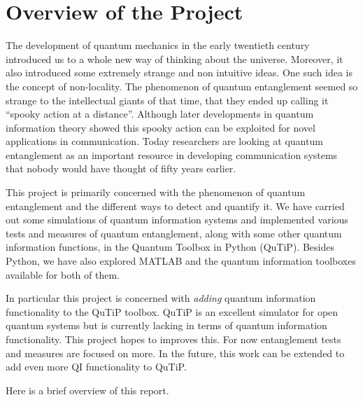 \chapter{Overview of the Project}

\par The development of quantum mechanics in the early twentieth century introduced us to a whole new way of thinking about the universe. Moreover, it also introduced some extremely strange and non intuitive ideas. One such idea is the concept of non-locality. The phenomenon of quantum entanglement seemed so strange to the intellectual giants of that time, that they ended up calling it “spooky action at a distance”. Although later developments in quantum information theory showed this spooky action can be exploited for novel applications in communication. Today researchers are looking at quantum entanglement as an important resource in developing communication systems that nobody would have thought of fifty years earlier.
\par This project is primarily concerned with the phenomenon of quantum entanglement and the different ways to detect and quantify it. We have carried out some simulations of quantum information systems and implemented various tests and measures of quantum entanglement, along with some other quantum information functions, in the Quantum Toolbox in Python (QuTiP). Besides Python, we have also explored MATLAB and the quantum information toolboxes available for both of them.
\par In particular this project is concerned with \textit{adding} quantum information functionality to the QuTiP toolbox. QuTiP is an excellent simulator for open quantum systems but is currently lacking in terms of quantum information functionality. This project hopes to improves this. For now entanglement tests and measures are focused on more. In the future, this work can be extended to add even more QI functionality to QuTiP.
\par Here is a brief overview of this report.
